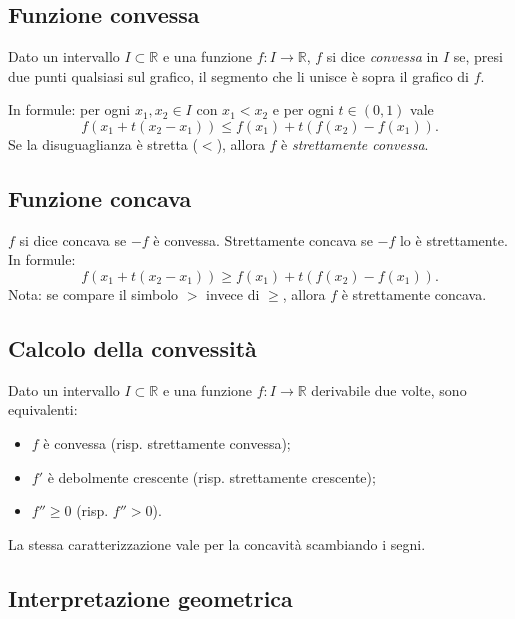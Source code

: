 \documentclass[12pt,a4paper]{article}
\begin{document}
\subsection{Funzione convessa}
Dato un intervallo $I \subset \mathbb{R}$ e una funzione $f : I \to \mathbb{R}$,  
$f$ si dice \emph{convessa} in $I$ se, presi due punti qualsiasi sul grafico, il segmento che li unisce è sopra il grafico di $f$.

In formule: per ogni $x_1, x_2 \in I$ con $x_1 < x_2$ e per ogni $t \in (0,1)$ vale
\[
f(x_1 + t(x_2 - x_1)) \le f(x_1) + t(f(x_2) - f(x_1)).
\]
Se la disuguaglianza è stretta ($<$), allora $f$ è \emph{strettamente convessa}.

\subsection{Funzione concava}
$f$ si dice concava se $-f$ è convessa.  
Strettamente concava se $-f$ lo è strettamente.\\
In formule:
\[
f(x_1 + t(x_2 - x_1)) \ge f(x_1) + t(f(x_2) - f(x_1)).
\]
Nota: se compare il simbolo $>$ invece di $\ge$, allora $f$ è strettamente concava.

\subsection{Calcolo della convessità}

Dato un intervallo $I \subset \mathbb{R}$ e una funzione $f : I \to \mathbb{R}$ derivabile due volte, sono equivalenti:

\begin{itemize}
  \item $f$ è convessa (risp. strettamente convessa);  
  \item $f'$ è debolmente crescente (risp. strettamente crescente);  
  \item $f'' \ge 0$ (risp. $f''>0$).
\end{itemize}
La stessa caratterizzazione vale per la concavità scambiando i segni.

\subsection{Interpretazione geometrica}
\end{document}

